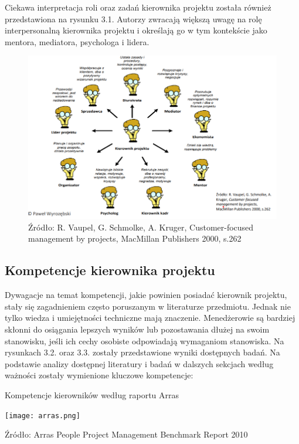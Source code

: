 Ciekawa interpretacja roli oraz zadań kierownika projektu została również przedstawiona na rysunku 3.1. Autorzy zwracają większą uwagę na rolę interpersonalną kierownika projektu i określają go w tym kontekście jako mentora, mediatora, psychologa i lidera.
\begin{figure}
\centering
\includegraphics[width=14cm]{img/rola.png}
\caption{Źródło: R. Vaupel, G. Schmolke, A. Kruger, Customer-focused management by projects, MacMillan Publishers 2000, s.262}
\end{figure}

\subsection{Kompetencje kierownika projektu}
Dywagacje na temat kompetencji, jakie powinien posiadać kierownik projektu, stały się zagadnieniem często poruszanym w literaturze przedmiotu. Jednak nie tylko wiedza i umiejętności techniczne mają znaczenie. Menedżerowie są bardziej skłonni do osiągania lepszych wyników lub pozostawania dłużej na swoim stanowisku, jeśli ich cechy osobiste odpowiadają wymaganiom stanowiska.\autocite{MUMFORD200011}
Na rysunkach 3.2. oraz 3.3. zostały przedstawione wyniki dostępnych badań.
Na podstawie analizy dostępnej literatury i badań w dalszych sekcjach według ważności zostały wymienione kluczowe kompetencje: \autocite{analizaMulti} \autocite{Alvarenga} \autocite{arras2010} \autocite{ziek} \autocite{brill} \autocite{arras2015}

\begin{table}
    \caption{Kompetencje kierowników według raportu Arras}
    \centering
    \texttt{[image: arras.png]}
    \caption*{Źródło: Arras People Project Management Benchmark Report 2010 }
  \end{table}


